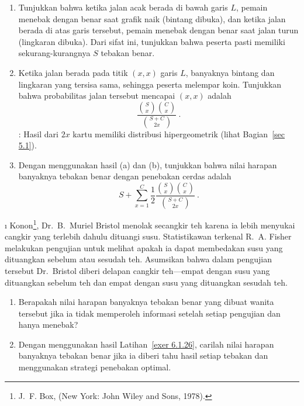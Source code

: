 \begin{LJSItem}

\begin{enumerate}
\item Tunjukkan bahwa ketika jalan acak berada di bawah garis $L$, pemain menebak dengan benar
saat grafik naik (bintang dibuka), dan ketika jalan berada di atas garis tersebut,
pemain menebak dengan benar saat jalan turun (lingkaran dibuka). Dari sifat ini,
tunjukkan bahwa peserta pasti memiliki sekurang-kurangnya $S$ tebakan benar.

\item Ketika jalan berada pada titik $(x,x)$  garis $L$, banyaknya bintang
dan lingkaran yang tersisa sama, sehingga peserta melempar koin. Tunjukkan bahwa
probabilitas jalan tersebut mencapai $(x,x)$ adalah
$$
\frac{{S \choose x}{C \choose x}}{{{S + C} \choose {2x}}}\ .
$$ : Hasil dari $2x$ kartu memiliki distribusi hipergeometrik (lihat
Bagian~\ref{sec 5.1}).

\item Dengan menggunakan hasil (a) dan (b), tunjukkan bahwa nilai harapan banyaknya
tebakan benar dengan penebakan cerdas adalah
$$ S + \sum_{x = 1}^C \frac12 \frac{{S \choose x}{C \choose x}}{{{S + C} \choose
{2x}}}\ .
$$
\end{enumerate}

\i\label{exer 6.1.27} Konon\footnote{J.~F. Box,   (New York: John Wiley and Sons, 1978).}, Dr.~B.~Muriel
Bristol menolak secangkir teh karena ia lebih menyukai cangkir yang terlebih dahulu dituangi
susu. Statistikawan terkenal R.~A. Fisher
melakukan pengujian untuk melihat apakah ia dapat membedakan susu yang dituangkan sebelum atau sesudah teh.
Asumsikan bahwa dalam pengujian tersebut Dr.~Bristol diberi delapan cangkir teh---empat dengan susu yang dituangkan
sebelum teh dan empat dengan susu yang dituangkan sesudah teh.

\begin{enumerate}
\item Berapakah nilai harapan banyaknya tebakan benar yang dibuat wanita tersebut jika ia tidak memperoleh
informasi setelah setiap pengujian dan hanya menebak?

\item Dengan menggunakan hasil Latihan~\ref{exer 6.1.26}, carilah nilai harapan banyaknya
tebakan benar jika ia diberi tahu hasil setiap tebakan dan menggunakan strategi penebakan
optimal.
\end{enumerate}


\end{LJSItem}
